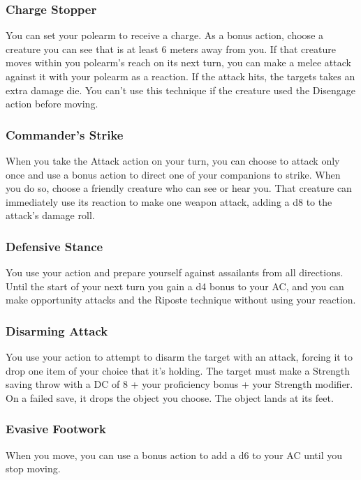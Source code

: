 \subsubsection{Charge Stopper} \label{tec::chargestopper}
You can set your polearm to receive a charge.
As a bonus action, choose a creature you can see that is at least 6 meters away from you.
If that creature moves within you polearm's reach on its next turn, you can make a melee attack against it with your polearm as a reaction.
If the attack hits, the targets takes an extra damage die.
You can't use this technique if the creature used the Disengage action before moving.

\subsubsection{Commander's Strike} \label{tec::commandersstrike}
When you take the Attack action on your turn, you can choose to attack only once and use a bonus action to direct one of your companions to strike.
When you do so, choose a friendly creature who can see or hear you.
That creature can immediately use its reaction to make one weapon attack, adding a d8 to the attack's damage roll.

\subsubsection{Defensive Stance} \label{tec::defensivestance}
You use your action and prepare yourself against assailants from all directions.
Until the start of your next turn you gain a d4 bonus to your AC, and you can make opportunity attacks and the Riposte technique without using your reaction.

\subsubsection{Disarming Attack} \label{tec::disarmingattack}
You use your action to attempt to disarm the target with an attack, forcing it to drop one item of your choice that it's holding.
The target must make a Strength saving throw with a DC of 8 + your proficiency bonus + your Strength modifier.
On a failed save, it drops the object you choose.
The object lands at its feet.

\subsubsection{Evasive Footwork} \label{tec::evasivefootwork}
When you move, you can use a bonus action to add a d6 to your AC until you stop moving.


